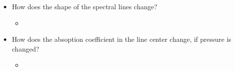 \documentclass[paper=a4, fontsize=11pt]{scrartcl} %
\numberwithin{figure}{section}
\begin{document}
\begin{itemize}
	\item How does the shape of the spectral lines change?
		\begin{itemize}
		\item 
		\end{itemize}
	\item How does the absoption coefficient in the line center change, if pressure is changed?
		\begin{itemize}
		\item 
		\end{itemize}
\end{itemize}

\end{document}
